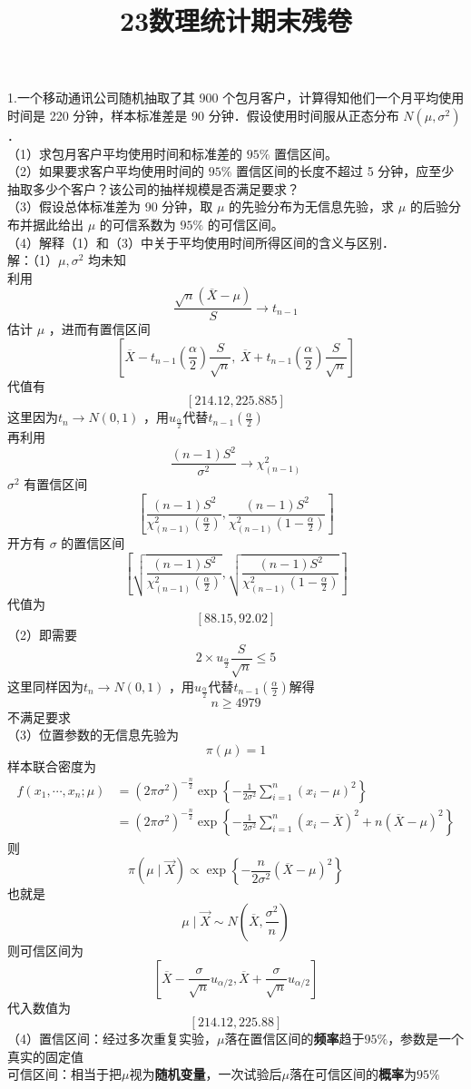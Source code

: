 \documentclass[UTF8]{ctexart}
\title{23数理统计期末残卷}
\author{\textcalligra{NULIOUS}}
\date{}
\begin{document}
	
\maketitle
\noindent 1.一个移动通讯公司随机抽取了其 900 个包月客户，计算得知他们一个月平均使用时间是 220 分钟，样本标准差是 90 分钟．假设使用时间服从正态分布 $N\left(\mu, \sigma^2\right)$ ．\\
（1）求包月客户平均使用时间和标准差的 $95 \%$ 置信区间。\\
（2）如果要求客户平均使用时间的 $95 \%$ 置信区间的长度不超过 5 分钟，应至少抽取多少个客户？该公司的抽样规模是否满足要求？\\
（3）假设总体标准差为 90 分钟，取 $\mu$ 的先验分布为无信息先验，求 $\mu$ 的后验分布并据此给出 $\mu$ 的可信系数为 $95 \%$ 的可信区间。\\
（4）解释（1）和（3）中关于平均使用时间所得区间的含义与区别．\\
解：（1）$\mu, \sigma^2$ 均未知\\
利用 
$$\frac{\sqrt{n}(\overline{X}-\mu)}{S} \rightarrow t_{n-1}$$
估计 $\mu$ ，进而有置信区间
\[
\left[ \overline{X} - t_{n-1}\left(\frac{\alpha}{2}\right) \frac{S}{\sqrt{n}},\ 
\overline{X} + t_{n-1}\left(\frac{\alpha}{2}\right) \frac{S}{\sqrt{n}} \right]
\]
代值有
$$[214.12,225.885]$$ 
这里因为$t_n\rightarrow N(0,1)$ ，用$u_{\frac{\alpha}{2}}$代替$t_{n-1}\left(\frac{\alpha}{2}\right)$\\
再利用 
$$\frac{(n-1) S^2}{\sigma^2} \rightarrow \chi^2_{(n-1)}$$
$\sigma^2$ 有置信区间 
$$\left[\frac{(n-1) S^2}{\chi^2_{(n-1)}\left(\frac{\alpha}{2}\right)}, \frac{(n-1) S^2}{\chi^2_{(n-1)}\left(1-\frac{\alpha}{2}\right)}\right]$$
开方有 $\sigma$ 的置信区间
$$
\left[\sqrt{\frac{(n-1) S^2}{\chi^2_{(n-1)}\left(\frac{\alpha}{2}\right)}},\sqrt{\frac{(n-1) S^2}{\chi^2_{(n-1)}\left(1-\frac{\alpha}{2}\right)}}\right]
$$
代值为
\[
[88.15,92.02]
\]
（2）即需要
\[
2\times u_{\frac{\alpha}{2}}\frac{S}{\sqrt{n}}\le 5
\]
这里同样因为$t_n\rightarrow N(0,1)$ ，用$u_{\frac{\alpha}{2}}$代替$t_{n-1}\left(\frac{\alpha}{2}\right)$解得
\[
n\ge 4979
\]
不满足要求\\
（3）位置参数的无信息先验为
\[
\pi(\mu)=1
\]
样本联合密度为
\[
\begin{aligned}
	f(x_1,\cdots,x_n;\mu) & =\left(2 \pi \sigma^2\right)^{-\frac{n}{2}} \exp \left\{-\frac{1}{2 \sigma^2}\sum_{i=1}^{n}\left(x_i-\mu\right)^2\right\} \\
	& =\left(2 \pi \sigma^2\right)^{-\frac{n}{2}} \exp \left\{-\frac{1}{2 \sigma^2} \sum_{i=1}^n\left(x_i-\overline{X}\right)^2+n(\overline{X}-\mu)^2\right\} 
\end{aligned}
\]
则
\[
\pi(\mu \mid \vec{X})\propto \exp\left\{-\frac{n}{2\sigma^2}\left(\overline{X}-\mu \right)^2 \right\}
\]
也就是
\[
\mu \mid \vec{X}\sim N\left(\overline{X},\frac{\sigma^2}{n} \right) 
\]
则可信区间为
\[
\left[\overline{X}-\frac{\sigma}{\sqrt{n}} u_{\alpha / 2}, \overline{X}+\frac{\sigma}{\sqrt{n}} u_{\alpha / 2} \right] 
\]
代入数值为
\[
[214.12,225.88]
\]
（4）置信区间：经过多次重复实验，$\mu$落在置信区间的\textbf{频率}趋于$95\%$，参数是一个真实的固定值\\
可信区间：相当于把$\mu$视为\textbf{随机变量}，一次试验后$\mu$落在可信区间的\textbf{概率}为$95\%$\\
\end{document}
